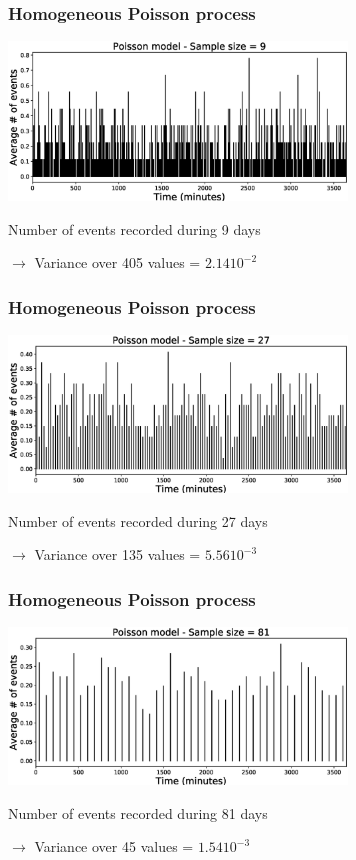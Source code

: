 \documentclass{beamer}
\begin{document}
	\begin{frame}
		\frametitle{Homogeneous Poisson process}
		\begin{center}
			\includegraphics[width=9cm, trim={1cm 0cm 3cm 0cm}, clip]{longrange/Poisson_3.eps}
		\end{center}
		Number of events recorded during 9 days

		$\rightarrow$ Variance over 405 values = $2.14 10^{-2}$
	\end{frame}

	\begin{frame}
		\frametitle{Homogeneous Poisson process}
		\begin{center}
			\includegraphics[width=9cm, trim={1cm 0cm 3cm 0cm}, clip]{longrange/Poisson_4.eps}
		\end{center}
		Number of events recorded during 27 days

		$\rightarrow$ Variance over 135 values = $5.56 10^{-3}$
	\end{frame}

	\begin{frame}
		\frametitle{Homogeneous Poisson process}
		\begin{center}
			\includegraphics[width=9cm, trim={1cm 0cm 3cm 0cm}, clip]{longrange/Poisson_5.eps}
		\end{center}
		Number of events recorded during 81 days

		$\rightarrow$ Variance over 45 values = $1.54 10^{-3}$
	\end{frame}
\end{document}
